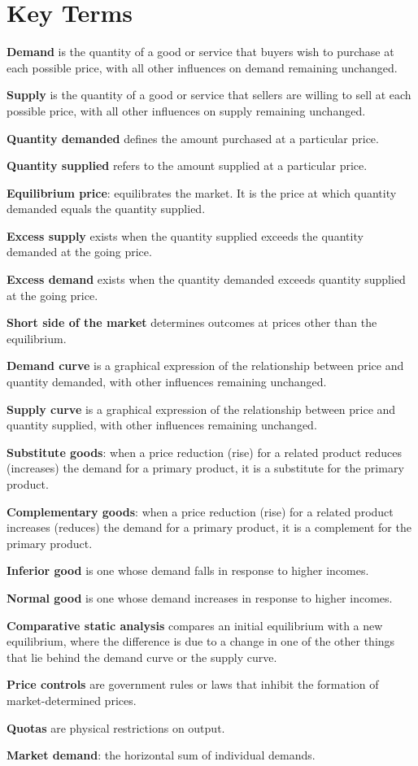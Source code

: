 \newpage
	\section*{Key Terms}
\begin{keyterms}
\textbf{Demand} is the quantity of a good or service that buyers wish to purchase at each possible price, with all other influences on demand remaining unchanged.

\textbf{Supply} is the quantity of a good or service that sellers are willing to sell at each possible price, with all other influences on supply remaining unchanged.

\textbf{Quantity demanded} defines the amount purchased at a particular price.

\textbf{Quantity supplied} refers to the amount supplied at a particular price.

\textbf{Equilibrium price}: equilibrates the market. It is the price at which quantity demanded equals the quantity supplied.

\textbf{Excess supply} exists when the quantity supplied exceeds the quantity demanded at the going price.

\textbf{Excess demand} exists when the quantity demanded exceeds quantity supplied at the going price.

\textbf{Short side of the market} determines outcomes at prices other than the equilibrium.

\textbf{Demand curve} is a graphical expression of the relationship between price and quantity demanded, with other influences remaining unchanged.

\textbf{Supply curve} is a graphical expression of the relationship between price and quantity supplied, with other influences remaining unchanged.

\textbf{Substitute goods}: when a price reduction (rise) for a related product reduces (increases) the demand for a primary product, it is a substitute for the primary product.

\textbf{Complementary goods}: when a price reduction (rise) for a related product increases (reduces) the demand for a primary product, it is a complement for the primary product.

\textbf{Inferior good} is one whose demand falls in response to higher incomes.

\textbf{Normal good} is one whose demand increases in response to higher incomes.

\textbf{Comparative static analysis} compares an initial equilibrium with a new equilibrium, where the difference is due to a change in one of the other things that lie behind the demand curve or the supply curve.

\textbf{Price controls} are government rules or laws that inhibit the formation of market-determined prices.

\textbf{Quotas} are physical restrictions on output.

\textbf{Market demand}: the horizontal sum of individual demands.
\end{keyterms}
